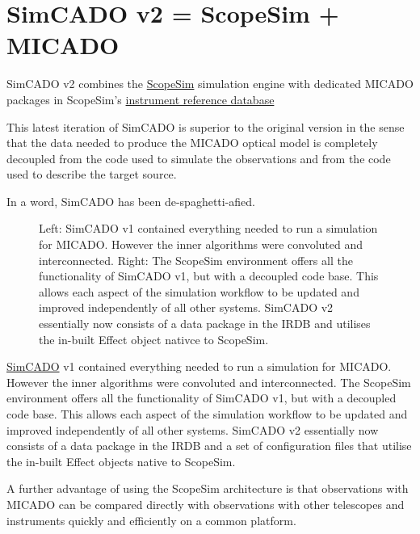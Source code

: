 

\section{SimCADO v2 = ScopeSim + MICADO%
  \label{simcado-v2-scopesim-micado}%
}

SimCADO v2 combines the \href{https://scopesim.readthedocs.io/en/latest/}{ScopeSim} simulation engine with dedicated MICADO packages in ScopeSim's \href{https://github.com/astronomyk/irdb}{instrument reference database}

This latest iteration of SimCADO is superior to the original version in the sense that the data needed to produce the MICADO optical model is completely decoupled from the code used to simulate the observations and from the code used to describe the target source.

In a word, SimCADO has been de-spaghetti-afied.

\begin{figure}
\noindent{}\label{fig-simcado-evolution}

\caption{Left: SimCADO v1 contained everything needed to run a simulation for MICADO.
However the inner algorithms were convoluted and interconnected.
Right: The ScopeSim environment offers all the functionality of SimCADO v1, but with a decoupled code base.
This allows each aspect of the simulation workflow to be updated and improved independently of all other systems.
SimCADO v2 essentially now consists of a data package in the IRDB and utilises the in-built Effect object nativce to ScopeSim.}
\end{figure}

\href{https://simcado.readthedocs.io/en/latest/}{SimCADO} v1 contained everything needed to run a simulation for MICADO.
However the inner algorithms were convoluted and interconnected.
The ScopeSim environment offers all the functionality of SimCADO v1, but with a decoupled code base.
This allows each aspect of the simulation workflow to be updated and improved independently of all other systems.
SimCADO v2 essentially now consists of a data package in the IRDB and a set of configuration files that utilise the in-built Effect objects native to ScopeSim.

A further advantage of using the ScopeSim architecture is that observations with MICADO can be compared directly with observations with other telescopes and instruments quickly and efficiently on a common platform.

